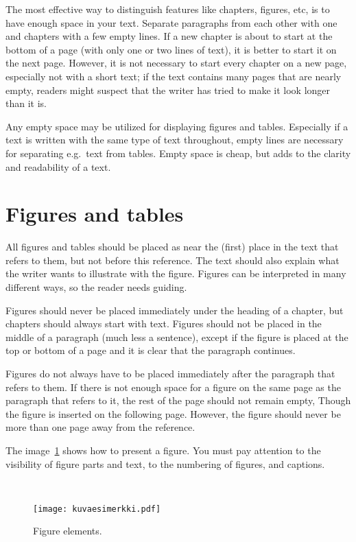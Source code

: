 The most effective way to distinguish features like chapters, figures, etc,  is to have enough space 
in your text.  Separate paragraphs from each other with one and chapters with a few empty lines.  If a 
new chapter is about to start at the bottom of a page (with only one or two lines of text), it is better 
to start it on the next page.  However, it is not necessary to start every chapter on a new page, especially 
not with a short text; if the text contains many pages that are nearly empty, readers might suspect that the 
writer has tried to make it look longer than it is.


Any empty space may be utilized for displaying figures and tables.  Especially if a text is written with the 
same type of text throughout, empty lines are necessary for separating e.g.~text from tables.  Empty space 
is cheap, but adds to the clarity and readability of a text.

\section{Figures and tables}


All figures and tables should be placed as near the (first) place in the text that refers to them, but 
not before this reference. The text should also explain what the writer wants to illustrate with the 
figure. Figures can be interpreted in many different ways, so the reader needs guiding.

Figures should never be placed immediately under the heading of a chapter, but chapters should always 
start with text. Figures should not be placed in the middle of a paragraph (much less a sentence), except 
if the figure is placed at the top or bottom of a page and it is clear that the paragraph continues.

Figures do not always have to be placed immediately after the paragraph that refers to them. If there is 
not enough space for a figure on the same page as the paragraph that refers to it, the rest of the page 
should not remain empty, Though the figure is inserted on the following page. However, the figure should 
never be more than one page away from the reference.


The image~\ref{kuvaesimerkki} shows how to present a figure. You must pay attention to the visibility of 
figure parts and text, to the numbering of figures, and captions. 

\begin{figure}[ht]
\ \newline
\begin{center}
\texttt{[image: kuvaesimerkki.pdf]}
\caption{Figure elements.}
\label{kuvaesimerkki}
\end{center}
\end{figure}


